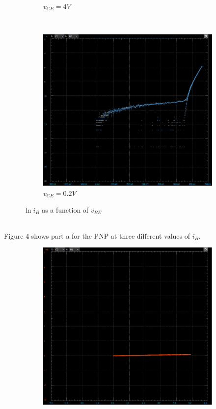 \documentclass[12pt]{article}
\begin{document}
\begin{enumerate}
\begin{enumerate}
\begin{figure}[h!]
\begin{subfigure}[b]{0.48\textwidth}
                \caption{$v_{CE} = 4V$}
            \end{subfigure}
            ~
            \begin{subfigure}[b]{0.48\textwidth}
                \includegraphics[width=\textwidth]{NCB02.png}
                \caption{$v_{CE} = 0.2V$}
            \end{subfigure}
            \caption{$\ln i_B$ as a function of $v_{BE}$}
        \end{figure} \\
        Figure 4 shows part a for the PNP at three different values of $i_B$. \\
        \begin{figure}[h!]
            \centering
            \begin{subfigure}[b]{0.31\textwidth}
                \includegraphics[width=\textwidth]{PAIB0.png}

\end{subfigure}
\end{figure}
\end{enumerate}
\end{enumerate}
\end{document}
